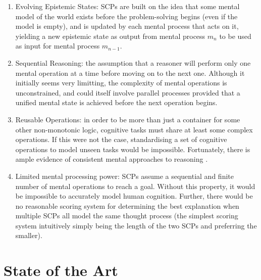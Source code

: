 \documentclass{article}
\begin{document}
\begin{enumerate}
\item Evolving Epistemic States: SCPs are built on the idea that some mental model of the world exists before the problem-solving begins (even if the model is empty), and is updated by each mental process that acts on it, yielding a new epistemic state as output from mental process $m_n$ to be used as input for mental process $m_{n-1}$.
\item Sequential Reasoning: the assumption that a reasoner will perform only one mental operation at a time before moving on to the next one. Although it initially seems very limitting, the complexity of mental operations is unconstrained, and could itself involve parallel processes provided that a unified mental state is achieved before the next operation begins.
\item Reusable Operations: in order to be more than just a container for some other non-monotonic logic, cognitive tasks must share at least some complex operations. If this were not the case, standardising a set of cognitive operations to model unseen tasks would be impossible. Fortunately, there is ample evidence of consistent mental approaches to reasoning \citep{ragni2017formal}.
\item Limited mental processing power: SCPs assume a sequential and finite number of mental operations to reach a goal. Without this property, it would be impossible to accurately model human cognition. Further, there would be no reasonable scoring system for determining the best explanation when multiple SCPs all model the same thought process (the simplest scoring system intuitively simply being the length of the two SCPs and preferring the smaller).
\end{enumerate}



\section{State of the Art}
\end{document}
